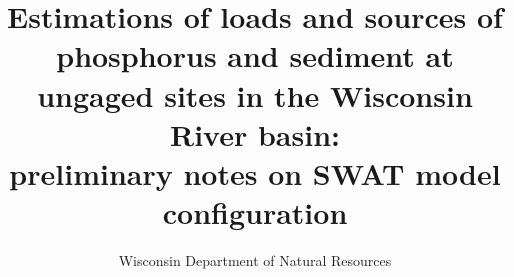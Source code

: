 \documentclass[10pt,letterpaper]{article}%
\author{Wisconsin Department of Natural Resources}
\title{Estimations of loads and sources of phosphorus and sediment at ungaged sites in the Wisconsin River basin: \\ preliminary notes on SWAT model configuration}
\begin{document}
\maketitle
\pagebreak

\tableofcontents
\pagebreak









\end{document}
